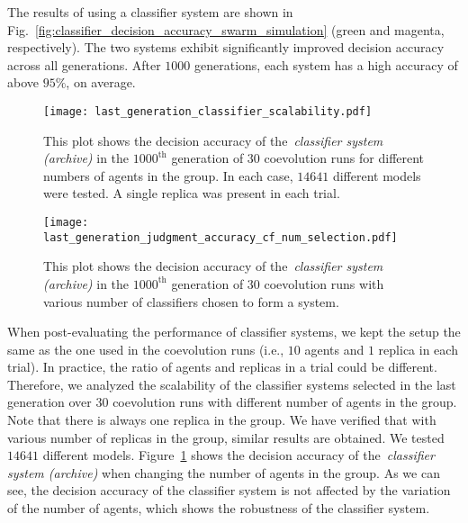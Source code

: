 The results of using a classifier system are shown in Fig.~\ref{fig:classifier_decision_accuracy_swarm_simulation} (green and magenta, respectively). The two systems exhibit significantly improved decision accuracy across all generations. After $1000$ generations, each system has a high accuracy of above $95\%$, on average. 
\begin{figure}[!t]
    \centering
    \texttt{[image: last\_generation\_classifier\_scalability.pdf]}
    \caption{This plot shows the decision accuracy of the~\textit{classifier system (archive)} in the $1000^\mathrm{th}$ generation of $30$ coevolution runs for different numbers of agents in the group. In each case, $14641$ different models were tested. A single replica was present in each trial.}
    \label{fig:classifier_scalability_aggregation}
\end{figure}
%
\begin{figure}[!t]%
	\centering
	\texttt{[image: last\_generation\_judgment\_accuracy\_cf\_num\_selection.pdf]}
	\caption{This plot shows the decision accuracy of the~\textit{classifier system (archive)} in the $1000^\mathrm{th}$ generation of $30$ coevolution runs with various number of classifiers chosen to form a system.}
	\label{fig:last_generation_judgment_accuracy_cf_num_selection}
\end{figure}

When post-evaluating the performance of classifier systems, we kept the setup the same as the one used in the coevolution runs (i.e., $10$ agents and $1$ replica in each trial). In practice, the ratio of agents and replicas in a trial could be different. Therefore, we analyzed the scalability of the classifier systems selected in the last generation over $30$ coevolution runs with different number of agents in the group. Note that there is always one replica in the group. We have verified that with various number of replicas in the group, similar results are obtained. We tested $14641$ different models. Figure~\ref{fig:classifier_scalability_aggregation} shows the decision accuracy of the~\textit{classifier system (archive)} when changing the number of agents in the group. As we can see, the decision accuracy of the classifier system is not affected by the variation of the number of agents, which shows the robustness of the classifier system.

